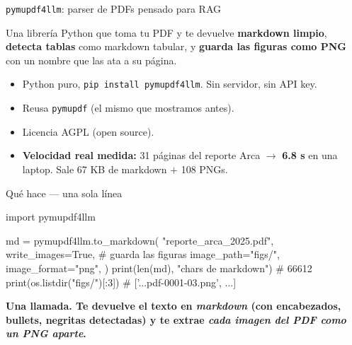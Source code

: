 \documentclass[aspectratio=169, 11pt]{beamer}
\begin{document}
\begin{frame}[shrink]{\texttt{pymupdf4llm}: parser de PDFs pensado para RAG}
  \vspace{8pt}
  \begin{tcolorbox}[colback=arcaGray, colframe=arcaRed, leftrule=3pt,
    boxrule=0pt, sharp corners, left=10pt, right=10pt, top=6pt, bottom=6pt]
    {\footnotesize\color{arcaDark}
    Una librería Python que toma tu PDF y te devuelve \textbf{markdown limpio},
    \textbf{detecta tablas} como markdown tabular, y \textbf{guarda las
    figuras como PNG} con un nombre que las ata a su página.}
  \end{tcolorbox}
  \vspace{10pt}
  \begin{itemize}\setlength{\itemsep}{4pt}
    \footnotesize
    \item Python puro, \texttt{pip install pymupdf4llm}. Sin servidor, sin API key.
    \item Reusa \texttt{pymupdf} (el mismo que mostramos antes).
    \item Licencia AGPL (open source).
    \item \textbf{Velocidad real medida:} 31 páginas del reporte Arca $\to$ \textbf{6.8 s}
    en una laptop. Sale 67 KB de markdown $+$ 108 PNGs.
  \end{itemize}
\end{frame}

\begin{frame}{Qué hace --- una sola línea}
  \begin{pyblock}
import pymupdf4llm

md = pymupdf4llm.to_markdown(
    "reporte_arca_2025.pdf",
    write_images=True,                  # guarda las figuras
    image_path="figs/",
    image_format="png",
)
print(len(md), "chars de markdown")    # 66612
print(os.listdir("figs/")[:3])          # ['...pdf-0001-03.png', ...]
  \end{pyblock}
  \vspace{6pt}
  \begin{tcolorbox}[colback=arcaRed!8, colframe=arcaRed, leftrule=3pt,
    boxrule=0pt, sharp corners, left=8pt, right=8pt, top=3pt, bottom=3pt]
    {\footnotesize\color{arcaDark}\bfseries
    Una llamada. Te devuelve el texto en \emph{markdown} (con encabezados,
    bullets, negritas detectadas) y te extrae \emph{cada imagen del PDF como un
    PNG aparte}.}
  \end{tcolorbox}
\end{frame}
\end{document}
